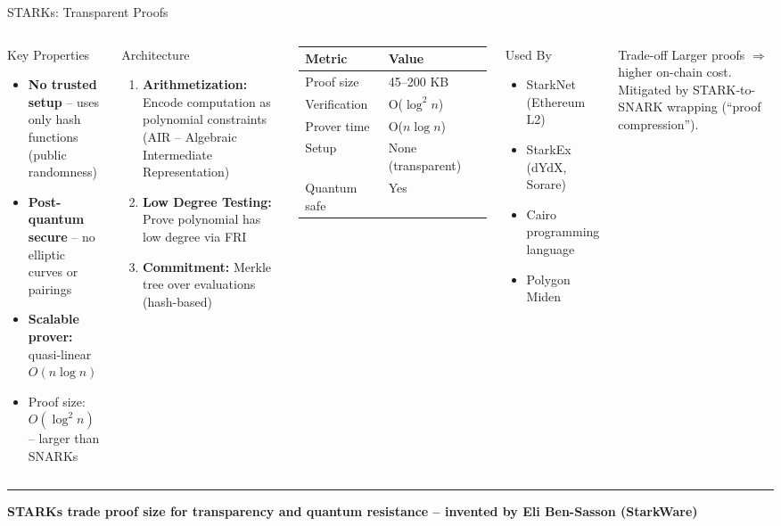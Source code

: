 \documentclass[8pt,aspectratio=169]{beamer}
\newcommand{\bottomnote}[1]{\vfill\vspace{-2mm}\textcolor{mllavender2}{\rule{\textwidth}{0.4pt}}\vspace{1mm}\footnotesize\textbf{#1}}
\begin{document}
\begin{frame}{STARKs: Transparent Proofs}
\begin{columns}[T]
\begin{block}{Key Properties}
\footnotesize
\begin{itemize}
  \item \textbf{No trusted setup} -- uses only hash functions (public randomness)
  \item \textbf{Post-quantum secure} -- no elliptic curves or pairings
  \item \textbf{Scalable prover:} quasi-linear $O(n \log n)$
  \item Proof size: $O(\log^2 n)$ -- larger than SNARKs
\end{itemize}
\end{block}
\vspace{1mm}
\begin{block}{Architecture}
\footnotesize
\begin{enumerate}
  \item \textbf{Arithmetization:} Encode computation as polynomial constraints (AIR -- Algebraic Intermediate Representation)
  \item \textbf{Low Degree Testing:} Prove polynomial has low degree via FRI
  \item \textbf{Commitment:} Merkle tree over evaluations (hash-based)
\end{enumerate}
\end{block}

\footnotesize
\begin{tabular}{ll}
\toprule
\textbf{Metric} & \textbf{Value} \\
\midrule
Proof size & 45--200 KB \\
Verification & O($\log^2 n$) \\
Prover time & O($n \log n$) \\
Setup & None (transparent) \\
Quantum safe & Yes \\
\bottomrule
\end{tabular}
\vspace{3mm}
\begin{exampleblock}{\footnotesize Used By}
\footnotesize
\begin{itemize}
  \item StarkNet (Ethereum L2)
  \item StarkEx (dYdX, Sorare)
  \item Cairo programming language
  \item Polygon Miden
\end{itemize}
\end{exampleblock}
\vspace{2mm}
\begin{block}{Trade-off}
\footnotesize
Larger proofs $\Rightarrow$ higher on-chain cost. Mitigated by STARK-to-SNARK wrapping (``proof compression'').
\end{block}
\end{columns}
\bottomnote{STARKs trade proof size for transparency and quantum resistance -- invented by Eli Ben-Sasson (StarkWare)}
\end{frame}
\end{document}
